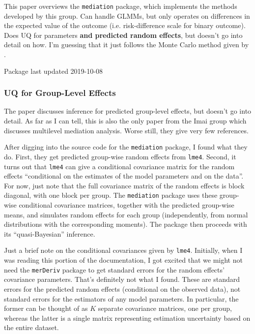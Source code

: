 \documentclass{report}
\begin{document}
This paper overviews the \texttt{mediation} package, which implements the methods developed by this group. Can handle GLMMs, but only operates on differences in the expected value of the outcome (i.e. risk-difference scale for binary outcome). Does UQ for parameters \textbf{and predicted random effects}, but doesn't go into detail on how. I'm guessing that it just follows the Monte Carlo method given by \citet{Ima10I}.

Package last updated 2019-10-08

\subsubsection{UQ for Group-Level Effects}
\label{sec:Imai_UQ}

The \citet{Tin14} paper discusses inference for predicted group-level effects, but doesn't go into detail. As far as I can tell, this is also the only paper from the Imai group which discusses multilevel mediation analysis. Worse still, they give very few references.

After digging into the source code for the \texttt{mediation} package, I found what they do. First, they get predicted group-wise random effects from \texttt{lme4}. Second, it turns out that \texttt{lme4} can give a conditional covariance matrix for the random effects ``conditional on the estimates of the model parameters and on the data''. For now, just note that the full covariance matrix of the random effects is block diagonal, with one block per group. The \texttt{mediation} package uses these group-wise conditional covariance matrices, together with the predicted group-wise means, and simulates random effects for each group (independently, from normal distributions with the corresponding moments). The package then proceeds with its ``quasi-Bayesian'' inference. 

Just a brief note on the conditional covariances given by \texttt{lme4}. Initially, when I was reading this portion of the documentation, I got excited that we might not need the \texttt{merDeriv} package to get standard errors for the random effects' covariance parameters. That's definitely not what I found. These are standard errors for the predicted random effects (conditional on the observed data), not standard errors for the estimators of any model parameters. In particular, the former can be thought of as $K$ separate covariance matrices, one per group, whereas the latter is a single matrix representing estimation uncertainty based on the entire dataset. 
\end{document}
